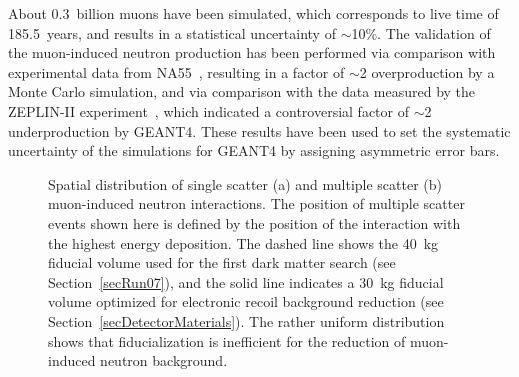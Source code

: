 About 0.3~billion muons have been simulated, which corresponds to live time of 185.5~years, and results in a statistical uncertainty of $\sim$10\%. The validation of the muon-induced neutron production has been performed via comparison with experimental data from NA55~\cite{MuonNeutronProd_NA55}, resulting in a factor of $\sim$2 overproduction by a Monte Carlo simulation, and via comparison with the data measured by the ZEPLIN-II experiment~\cite{MuonNeutronProd_ZeplinAraujo, MuonNeutronProd_Zeplin}, which indicated a controversial factor of $\sim$2 underproduction by GEANT4. These results have been used to set the systematic uncertainty of the simulations for GEANT4 by assigning asymmetric error bars.

\begin{figure}[!b]
\centering
{}
\caption[Spatial distribution of nuclear recoils from muon-induced neutron interactions]{Spatial distribution of single scatter (a) and multiple scatter (b) muon-induced neutron interactions. The position of multiple scatter events shown here is defined by the position of the interaction with the highest energy deposition. The dashed line shows the 40~kg fiducial volume used for the first dark matter search (see Section~\ref{secRun07}), and the solid line indicates a 30~kg fiducial volume optimized for electronic recoil background reduction (see Section~\ref{secDetectorMaterials}). The rather uniform distribution shows that fiducialization is inefficient for the reduction of muon-induced neutron background.}
\label{figMuonInducedAZ}
\end{figure}


